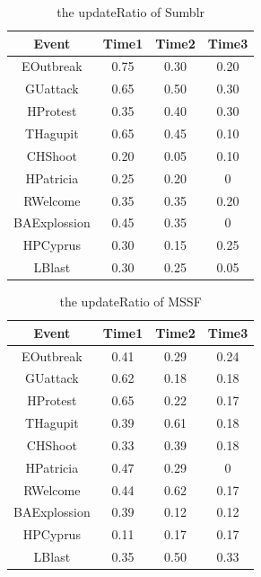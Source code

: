 \documentclass{llncs}
\begin{document}
\begin{table}[htp]\label{table:update 0f sumblr}
\caption{the updateRatio of Sumblr}
\begin{center}
\begin{tabular}{|c|c|c|c|}
    \hline
    Event & Time1 & Time2 & Time3 \\
    \hline
    EOutbreak & 0.75 & 0.30 & 0.20 \\
    \hline
    GUattack & 0.65 & 0.50 & 0.30 \\
    \hline
    HProtest & 0.35 & 0.40 & 0.30 \\
    \hline
    THagupit & 0.65 & 0.45 & 0.10\\
    \hline
    CHShoot & 0.20 & 0.05 & 0.10\\
    \hline
    HPatricia & 0.25 & 0.20 & 0\\
    \hline
    RWelcome & 0.35 & 0.35 & 0.20\\
    \hline
    BAExplossion & 0.45 & 0.35 & 0\\
    \hline
    HPCyprus & 0.30 & 0.15 & 0.25\\
    \hline
    LBlast & 0.30 & 0.25 & 0.05\\
    \hline
\end{tabular}
\end{center}
\label{default}
\end{table}

\begin{table}[htp]\label{table:update 0f mssf}
\caption{the updateRatio of MSSF}
\begin{center}
    \begin{tabular}{|c|c|c|c|}
    \hline
    Event & Time1 & Time2 & Time3 \\
    \hline
    EOutbreak & 0.41 & 0.29 & 0.24 \\
    \hline
    GUattack & 0.62 & 0.18 & 0.18 \\
    \hline
    HProtest & 0.65 & 0.22 & 0.17 \\
    \hline
    THagupit & 0.39 & 0.61 & 0.18\\
    \hline
    CHShoot & 0.33 & 0.39 & 0.18\\
    \hline
    HPatricia & 0.47 & 0.29 & 0\\
    \hline
    RWelcome & 0.44 & 0.62 & 0.17\\
    \hline
    BAExplossion & 0.39 & 0.12 & 0.12\\
    \hline
    HPCyprus & 0.11 & 0.17 & 0.17\\
    \hline
    LBlast & 0.35 & 0.50 & 0.33\\
    \hline
    \end{tabular}
\end{center}
\label{default}
\end{table}
\end{document}
